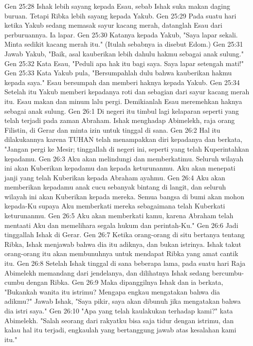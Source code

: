Gen 25:28  Ishak lebih sayang kepada Esau, sebab Ishak suka makan daging buruan. Tetapi Ribka lebih sayang kepada Yakub.
Gen 25:29  Pada suatu hari ketika Yakub sedang memasak sayur kacang merah, datanglah Esau dari perburuannya. Ia lapar.
Gen 25:30  Katanya kepada Yakub, "Saya lapar sekali. Minta sedikit kacang merah itu." (Itulah sebabnya ia disebut Edom.)
Gen 25:31  Jawab Yakub, "Baik, asal kauberikan lebih dahulu hakmu sebagai anak sulung."
Gen 25:32  Kata Esau, "Peduli apa hak itu bagi saya. Saya lapar setengah mati!"
Gen 25:33  Kata Yakub pula, "Bersumpahlah dulu bahwa kauberikan hakmu kepada saya." Esau bersumpah dan memberi haknya kepada Yakub.
Gen 25:34  Setelah itu Yakub memberi kepadanya roti dan sebagian dari sayur kacang merah itu. Esau makan dan minum lalu pergi. Demikianlah Esau meremehkan haknya sebagai anak sulung.
Gen 26:1  Di negeri itu timbul lagi kelaparan seperti yang telah terjadi pada zaman Abraham. Ishak menghadap Abimelekh, raja orang Filistin, di Gerar dan minta izin untuk tinggal di sana.
Gen 26:2  Hal itu dilakukannya karena TUHAN telah menampakkan diri kepadanya dan berkata, "Jangan pergi ke Mesir; tinggallah di negeri ini, seperti yang telah Kuperintahkan kepadamu.
Gen 26:3  Aku akan melindungi dan memberkatimu. Seluruh wilayah ini akan Kuberikan kepadamu dan kepada keturunanmu. Aku akan menepati janji yang telah Kuberikan kepada Abraham ayahmu.
Gen 26:4  Aku akan memberikan kepadamu anak cucu sebanyak bintang di langit, dan seluruh wilayah ini akan Kuberikan kepada mereka. Semua bangsa di bumi akan mohon kepada-Ku supaya Aku memberkati mereka sebagaimana telah Kuberkati keturunanmu.
Gen 26:5  Aku akan memberkati kamu, karena Abraham telah mentaati Aku dan memelihara segala hukum dan perintah-Ku."
Gen 26:6  Jadi tinggallah Ishak di Gerar.
Gen 26:7  Ketika orang-orang di situ bertanya tentang Ribka, Ishak menjawab bahwa dia itu adiknya, dan bukan istrinya. Ishak takut orang-orang itu akan membunuhnya untuk mendapat Ribka yang amat cantik itu.
Gen 26:8  Setelah Ishak tinggal di sana beberapa lama, pada suatu hari Raja Abimelekh memandang dari jendelanya, dan dilihatnya Ishak sedang bercumbu-cumbu dengan Ribka.
Gen 26:9  Maka dipanggilnya Ishak dan ia berkata, "Bukankah wanita itu istrimu? Mengapa engkau mengatakan bahwa dia adikmu?" Jawab Ishak, "Saya pikir, saya akan dibunuh jika mengatakan bahwa dia istri saya."
Gen 26:10  "Apa yang telah kaulakukan terhadap kami?" kata Abimelekh. "Salah seorang dari rakyatku bisa saja tidur dengan istrimu, dan kalau hal itu terjadi, engkaulah yang bertanggung jawab atas kesalahan kami itu."
